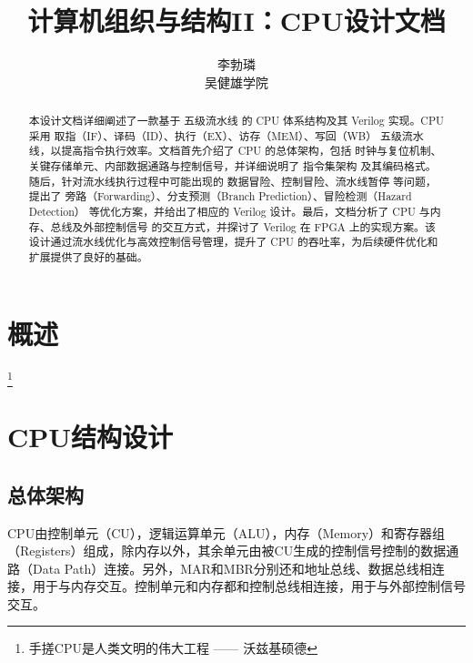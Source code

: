 \documentclass[lang=cn,a4paper,newtx]{elegantpaper}
\title{计算机组织与结构II：CPU设计文档}
\author{李勃璘 \\ 吴健雄学院}
\date{\zhdate{2025/4/11}}
\begin{document}
\maketitle
\thispagestyle{empty}
\begin{abstract}
本设计文档详细阐述了一款基于 五级流水线 的 CPU 体系结构及其 Verilog 实现。CPU 采用 取指（IF）、译码（ID）、执行（EX）、访存（MEM）、写回（WB） 五级流水线，以提高指令执行效率。文档首先介绍了 CPU 的总体架构，包括 时钟与复位机制、关键存储单元、内部数据通路与控制信号，并详细说明了 指令集架构 及其编码格式。随后，针对流水线执行过程中可能出现的 数据冒险、控制冒险、流水线暂停 等问题，提出了 旁路（Forwarding）、分支预测（Branch Prediction）、冒险检测（Hazard Detection） 等优化方案，并给出了相应的 Verilog 设计。最后，文档分析了 CPU 与内存、总线及外部控制信号 的交互方式，并探讨了 Verilog 在 FPGA 上的实现方案。该设计通过流水线优化与高效控制信号管理，提升了 CPU 的吞吐率，为后续硬件优化和扩展提供了良好的基础。
\end{abstract}








\newpage
{}
\tableofcontents
\newpage
\listoftables
\newpage
{}
\section{概述}
\lipsum[5]\footnote{手搓CPU是人类文明的伟大工程 —— 沃兹基硕德}


\section{CPU结构设计}
\subsection{总体架构}
CPU由控制单元（CU），逻辑运算单元（ALU），内存（Memory）和寄存器组（Registers）组成，除内存以外，其余单元由被CU生成的控制信号控制的数据通路（Data Path）连接。另外，MAR和MBR分别还和地址总线、数据总线相连接，用于与内存交互。控制单元和内存都和控制总线相连接，用于与外部控制信号交互。
\end{document}
